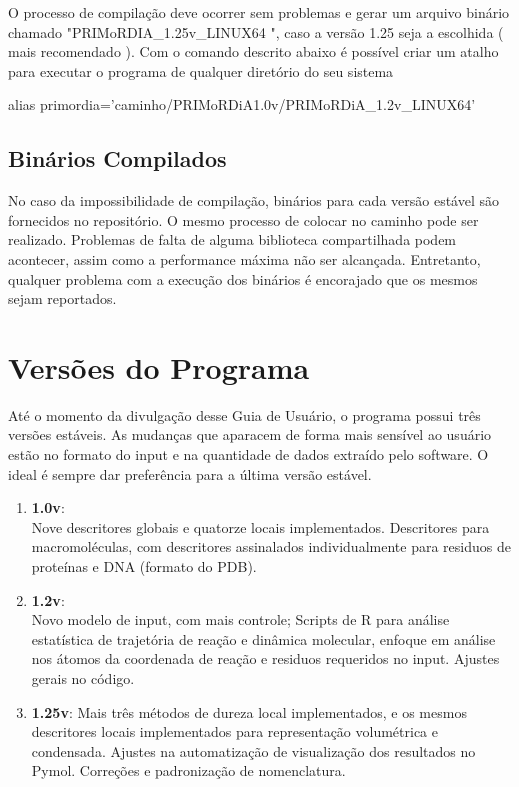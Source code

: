 \documentclass[a4paper,11pt]{refart}
\begin{document}
O processo de compilação deve ocorrer sem problemas e gerar um arquivo binário chamado "PRIMoRDIA\_1.25v\_LINUX64 ", caso a versão 1.25 seja a escolhida ( mais recomendado ).
Com o comando descrito abaixo é possível criar um atalho para executar o programa de qualquer diretório do seu sistema

\hspace*{-\leftmarginwidth}
\begin{minipage}{\fullwidth}
\begin{commandshell}
alias primordia='caminho/PRIMoRDiA1.0v/PRIMoRDiA\_1.2v\_LINUX64'
\end{commandshell}
\end{minipage}


\subsection{Binários Compilados} 

No caso da impossibilidade de compilação, binários para cada versão estável são fornecidos no repositório. O mesmo processo de colocar no caminho pode ser realizado. Problemas de falta de alguma biblioteca compartilhada podem acontecer, assim como a performance máxima não ser alcançada. Entretanto, qualquer problema com a execução dos binários é encorajado que os mesmos sejam reportados. 

\newpage
\section{Versões do Programa}

Até o momento da divulgação desse Guia de Usuário, o programa possui três versões estáveis. 
As mudanças que aparacem de forma mais sensível ao usuário estão no formato do input e na quantidade de dados extraído pelo software. O ideal é sempre dar preferência para a última versão estável. 

\begin{enumerate}
	\item \textbf{1.0v}:\\
	Nove descritores globais e quatorze locais implementados. Descritores para macromoléculas, com descritores assinalados individualmente para residuos de proteínas e DNA (formato do PDB).  
	\item \textbf{1.2v}:
	\\ Novo modelo de input, com mais controle; Scripts de R para análise estatística de trajetória de reação e dinâmica molecular, enfoque em análise nos átomos da coordenada de reação e residuos requeridos no input. Ajustes gerais no código. 
	\item \textbf{1.25v}: Mais três métodos de dureza local implementados, e os mesmos descritores locais implementados para representação volumétrica e condensada. Ajustes na automatização de visualização dos resultados no Pymol. Correções e padronização de nomenclatura. 
\end{enumerate}
\end{document}
